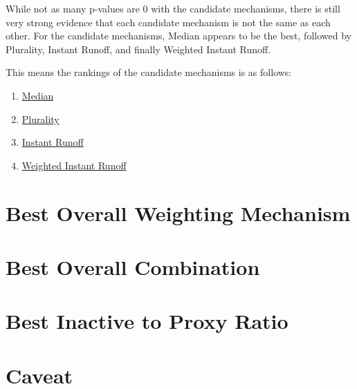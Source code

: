 While not as many p-values are 0 with the candidate mechanisms, there is still very
strong evidence that each candidate mechanism is not the same as each other.
For the candidate mechanisms, Median appears to be the best, followed
by Plurality, Instant Runoff, and finally Weighted Instant Runoff.
\begin{samepage}
    This means the rankings of the candidate mechanisms is as follows:
    \begin{enumerate}
        \item \hyperref[para:median]{Median}
        \item \hyperref[para:plurality]{Plurality}
        \item \hyperref[para:cand-instant-runoff]{Instant Runoff}
        \item \hyperref[para:cand-weighted-instant-runoff]{Weighted Instant Runoff}
    \end{enumerate}
\end{samepage}


\section{Best Overall Weighting Mechanism}\label{sec:best-overall-weighting-mechanism}


\section{Best Overall Combination}\label{sec:best-overall-combination}


\section{Best Inactive to Proxy Ratio}\label{sec:best-inactive-to-proxy-count}


\section{Caveat}\label{sec:caveat}

